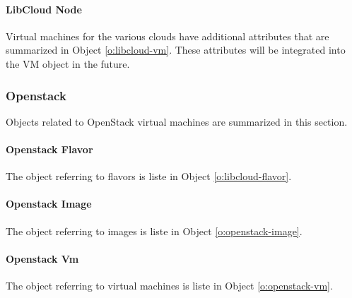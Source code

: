 \documentclass[10pt]{article}
\begin{document}

\paragraph{LibCloud Node}\label{S:libcloudnode}

Virtual machines for the various clouds have additional attributes
that are summarized in Object \ref{o:libcloud-vm}. These attributes 
will be integrated into the VM object in the future.



\subsubsection{Openstack}\label{S:openstack}

Objects related to OpenStack virtual machines are summarized in this
section.

\paragraph{Openstack Flavor}

The object referring to flavors is liste in Object
\ref{o:libcloud-flavor}.


\paragraph{Openstack Image}

The object referring to images is liste in Object
\ref{o:openstack-image}.


\paragraph{Openstack Vm}

The object referring to virtual machines is liste in Object \ref{o:openstack-vm}.


\end{document}
